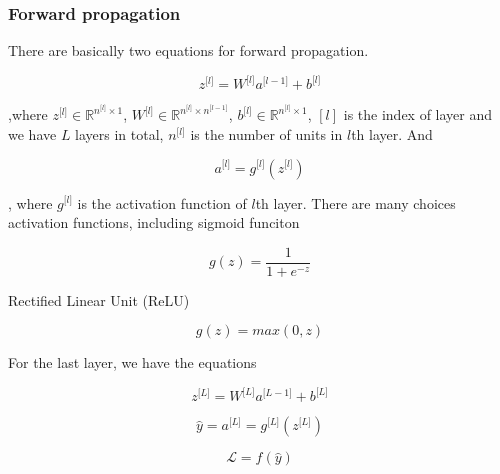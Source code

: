 \documentclass[11pt]{scrartcl} %
\begin{document}
\subsubsection{Forward propagation}

There are basically two equations for forward propagation.

\begin{equation}
z^{\lbrack l\rbrack}=W^{\lbrack l\rbrack}a^{\lbrack l-1\rbrack}+b^{\lbrack l\rbrack}
\label{fp1}
\end{equation}

,where $z^{\lbrack l\rbrack}\in\mathbb{R}^{n^{\lbrack l\rbrack}\times1}$, $W^{\lbrack l\rbrack}\in\mathbb{R}^{n^{\lbrack l\rbrack}\times n^{\lbrack l-1\rbrack}}$, $b^{\lbrack l\rbrack}\in\mathbb{R}^{n^{\lbrack l\rbrack}\times1}$, $[l]$ is the index of layer and we have $L$ layers in total, $n^{\lbrack l\rbrack}$ is the number of units in $l$th layer. And

\begin{equation}
a^{\lbrack l\rbrack}=g^{\lbrack l\rbrack}(z^{\lbrack l\rbrack})
\label{fp2}
\end{equation}

, where $g^{\lbrack l\rbrack}$ is the activation function of $l$th layer. There are many choices activation functions, including sigmoid funciton

\begin{equation}
g(z)=\frac1{1+e^{-z}}
\end{equation}

Rectified Linear Unit (ReLU)

\begin{equation}
g(z)=max(0,z)
\end{equation}

For the last layer, we have the equations

\begin{equation}
z^{\lbrack L\rbrack}=W^{\lbrack L\rbrack}a^{\lbrack L-1\rbrack}+b^{\lbrack L\rbrack}
\end{equation}

\begin{equation}
\widehat y=a^{\lbrack L\rbrack}=g^{\lbrack L\rbrack}(z^{\lbrack L\rbrack})
\end{equation}


\begin{equation}
\mathcal L=f(\widehat y)
\end{equation}
\end{document}
